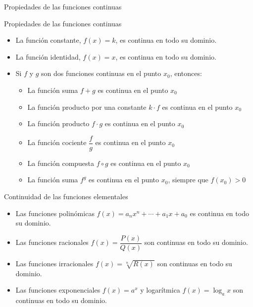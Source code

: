 \documentclass[8pt]{beamer}
\begin{document}
\begin{frame}[t]{Propiedades de las funciones continuas}
\begin{alertblock}{Propiedades de las funciones continuas}
\begin{itemize}
\item La función constante, $f(x)=k$, es continua en todo su dominio.
\item La función identidad, $f(x)=x$, es continua en todo su dominio.
\item Si $f$ y $g$ son dos funciones continuas en el punto $x_0$, entonces:
\begin{itemize}
\item La función suma $f+g$ es continua en el punto $x_0$
\item La función producto por una constante $k\cdot f$ es continua en el punto $x_0$
\item La función producto $f \cdot g$ es continua en el punto $x_0$
\item La función cociente $\dfrac{f}{g}$ es continua en el punto $x_0$
\item La función compuesta $f \circ g$ es continua en el punto $x_0$
\item La función suma $f^g$ es continua en el punto $x_0$, siempre que $f(x_0)>0$
\end{itemize}
\end{itemize}
\end{alertblock}
\begin{alertblock}{Continuidad de las funciones elementales}
\begin{itemize}
\item Las funciones polinómicas $f(x)=a_nx^n+\cdots +a_1x+a_0$ es continua en todo su dominio.
\item Las funciones racionales $f(x)=\dfrac{P(x)}{Q(x)}$ son continuas en todo su dominio.
\item Las funciones irracionales $f(x)=\sqrt[n]{R(x)}$ son continuas en todo su dominio.
\item Las funciones exponenciales $f(x)=a^x$ y logarítmica $f(x)=\log_ax$ son continuas en todo su dominio.
\end{itemize}
\end{alertblock}
\end{frame}
\end{document}
